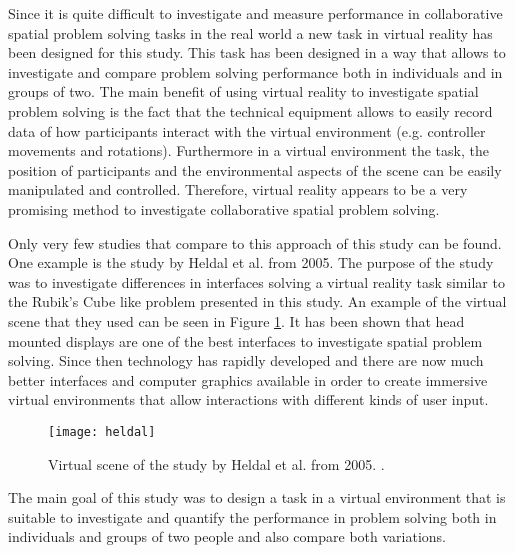 Since it is quite difficult to investigate and measure performance in collaborative spatial problem solving tasks in the real world a new task in virtual reality has been designed for this study. This task has been designed in a way that allows to investigate and compare problem solving performance both in individuals and in groups of two. The main benefit of using virtual reality to investigate spatial problem solving is the fact that the technical equipment allows to easily record data of how participants interact with the virtual environment (e.g. controller movements and rotations). Furthermore in a virtual environment the task, the position of participants and the environmental aspects of the scene can be easily manipulated and controlled. Therefore, virtual reality appears to be a very promising method to investigate collaborative spatial problem solving. 

Only very few studies that compare to this approach of this study can be found. One example is the study by Heldal et al. from 2005. \cite{heldal2005}
The purpose of the study was to investigate differences in interfaces solving a virtual reality task similar to the Rubik's Cube like problem presented in this study. An example of the virtual scene that they used can be seen in Figure \ref{fig:heldal}. It has been shown that head mounted displays are one of the best interfaces to investigate spatial problem solving. Since then technology has rapidly developed and there are now much better interfaces and computer graphics available in order to create immersive virtual environments that allow interactions with different kinds of user input.

\begin{figure}[h]
\centering
\texttt{[image: heldal]}
\caption{Virtual scene of the study by Heldal et al. from 2005. \cite{heldal2005}.}
\label{fig:heldal}
\end{figure}

 The main goal of this study was to design a task in a virtual environment that is suitable to investigate and quantify the performance in problem solving both in individuals and groups of two people and also compare both variations.
